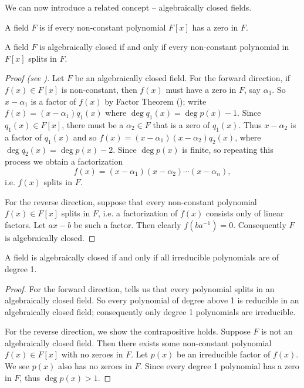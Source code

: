 We can now introduce a related concept -- algebraically closed fields.

\begin{definition}
    A field $F$ is  if every non-constant polynomial $F[x]$ has a zero in $F$.
\end{definition}

\begin{theorem}\label{thrm-algebraically-closed-iff-polynomials-split-in-field}
    A field $F$ is algebraically closed if and only if every non-constant polynomial in $F[x]$ splits in $F$.
\end{theorem}
\begin{proof}[Proof (see {\cite[Theorem 21.25]{judson_beezer_2022}})]
    Let $F$ be an algebraically closed field. For the forward direction, if $f(x) \in F[x]$ is non-constant, then $f(x)$ must have a zero in $F$, say $\alpha_1$. So $x-\alpha_1$ is a factor of $f(x)$ by Factor Theorem (); write $f(x) = (x-\alpha_1)q_1(x)$ where $\deg q_1(x) = \deg p(x) - 1$. Since $q_1(x) \in F[x]$, there must be a $\alpha_2\in F$ that is a zero of $q_1(x)$. Thus $x-\alpha_2$ is a factor of $q_1(x)$ and so $f(x) = (x-\alpha_1)(x-\alpha_2)q_2(x)$, where $\deg q_2(x) = \deg p(x) - 2$. Since $\deg p(x)$ is finite, so repeating this process we obtain a factorization
    \[
        f(x) = (x-\alpha_1)(x-\alpha_2)\cdots(x-\alpha_n),
    \]
    i.e. $f(x)$ splits in $F$.

    For the reverse direction, suppose that every non-constant polynomial $f(x) \in F[x]$ splits in $F$, i.e. a factorization of $f(x)$ consists only of linear factors. Let $ax-b$ be such a factor. Then clearly $f(ba^{-1}) = 0$. Consequently $F$ is algebraically closed.
\end{proof}

\begin{corollary}\label{corollary-field-is-algebraically-closed-iff-irreducible-polynomials-are-of-degree-1}
    A field is algebraically closed if and only if all irreducible polynomials are of degree 1.
\end{corollary}
\begin{proof}
    For the forward direction,  tells us that every polynomial splits in an algebraically closed field. So every polynomial of degree above 1 is reducible in an algebraically closed field; consequently only degree 1 polynomials are irreducible.

    For the reverse direction, we show the contrapositive holds. Suppose $F$ is not an algebraically closed field. Then there exists some non-constant polynomial $f(x) \in F[x]$ with no zeroes in $F$. Let $p(x)$ be an irreducible factor of $f(x)$. We see $p(x)$ also has no zeroes in $F$. Since every degree 1 polynomial has a zero in $F$, thus $\deg p(x) > 1$.
\end{proof}

